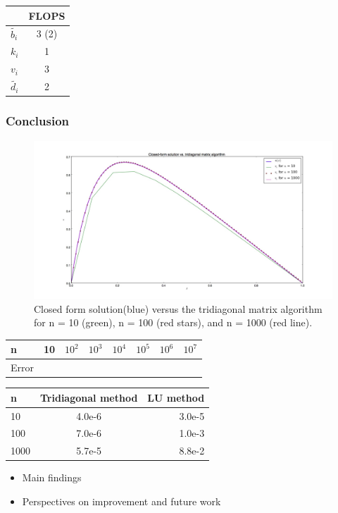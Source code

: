 \documentclass[12pt]{article}
\begin{document}
\begin{center}
  \begin{tabular}{ l | c }
    &FLOPS \\ \hline
    $\tilde{b_i}$ & 3 (2) \\
    $k_i$& 1 \\
    $v_i$ & 3 \\
    $\tilde{d_i}$ & 2
  \end{tabular}
\end{center}
\subsubsection*{Conclusion}


\begin{center}
    \begin{figure}[h!]
        \includegraphics[width=1.4\textwidth, center]{figure_1b.png}
        \caption{Closed form solution(blue) versus the     tridiagonal matrix algorithm for n = 10     (green), n = 100 (red stars), and n = 1000 (red     line). }
        \label{fig:1b}
    \end{figure}
\end{center}

\begin{center}
  \begin{tabular}{ l | c | c | c | c | c | c | r}
  n & 10 &$10^2$ &$10^3$ &$10^4$& $10^5$&$10^6$&$10^7$\\ \hline
    Error &&&&&&& \\
  \end{tabular}
\end{center}

\begin{center}
  \begin{tabular}{ l | c | r }
    n & Tridiagonal method & LU method \\ \hline
    10 & 4.0e-6 & 3.0e-5 \\
    100 & 7.0e-6 & 1.0e-3 \\
    1000 & 5.7e-5& 8.8e-2 \\
  \end{tabular}
\end{center}
\begin{itemize}
\item Main findings
\item Perspectives on improvement and future work
\end{itemize}
\end{document}

